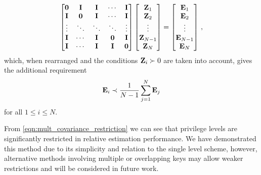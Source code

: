 \documentclass[letterpaper, 10 pt, conference]{ieeeconf}
\begin{document}
\begin{equation}
   \begin{bmatrix}
      {\ensuremath{{\mathbf{0}}}} & {{\mathbf{I}}} & {{\mathbf{I}}} & \cdots & {{\mathbf{I}}}\\
      {{\mathbf{I}}} & {{\mathbf{0}}} & {{\mathbf{I}}} & \cdots & {{\mathbf{I}}}\\
      \vdots & \ddots & \ddots & \ddots & \vdots\\
      {{\mathbf{I}}} & \cdots & {{\mathbf{I}}} & {{\mathbf{0}}} & {{\mathbf{I}}}\\
      {{\mathbf{I}}} & \cdots & {{\mathbf{I}}} & {{\mathbf{I}}} & {{\mathbf{0}}}
   \end{bmatrix}
   \begin{bmatrix}
      {\ensuremath{{\mathbf{Z}}}}_1\\
      {{\mathbf{Z}}}_2\\
      \vdots\\
      {{\mathbf{Z}}}_{N-1}\\
      {{\mathbf{Z}}}_N
   \end{bmatrix}
   =
   \begin{bmatrix}
      {\ensuremath{{\mathbf{E}}}}_1\\
      {{\mathbf{E}}}_2\\
      \vdots\\
      {{\mathbf{E}}}_{N-1}\\
      {{\mathbf{E}}}_N
   \end{bmatrix}\,,
\end{equation}
which, when rearranged and the conditions ${{\mathbf{Z}}}_i\succ 0$ are taken into account, gives the additional requirement
\begin{equation}\label{eqn:mult_covariance_restriction}
   {\ensuremath{{\mathbf{E}}}}_i \prec \frac{1}{N-1}\sum_{j=1}^{N}{{\mathbf{E}}}_j
\end{equation}
for all $1 \leq i \leq N$.

From \eqref{eqn:mult_covariance_restriction} we can see that privilege levels are significantly restricted in relative estimation performance. We have demonstrated this method due to its simplicity and relation to the single level scheme, however, alternative methods involving multiple or overlapping keys may allow weaker restrictions and will be considered in future work.

% 
%                                                                                        
%                                                                                        
%                                                                                        
% 
\end{document}
